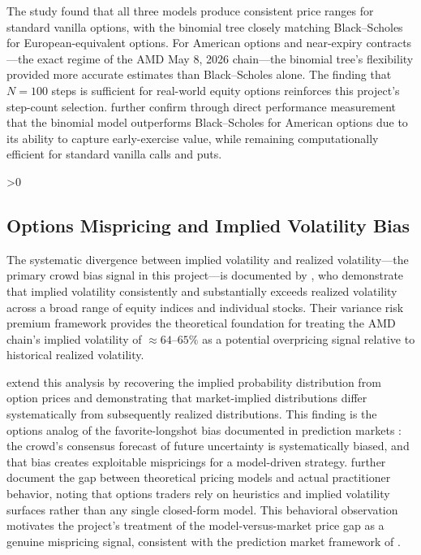 \documentclass[12pt, letterpaper]{article}
\let\oldsubsection\subsection
\renewcommand{\subsection}{%
  \ifnum\value{subsection}>0 \clearpage\fi
  \oldsubsection
}
\begin{document}
The study found that all three models produce consistent price ranges
for standard vanilla options, with the binomial tree closely matching
Black--Scholes for European-equivalent options. For American options
and near-expiry contracts---the exact regime of the AMD May 8, 2026
chain---the binomial tree's flexibility provided more accurate
estimates than Black--Scholes alone. The finding that $N = 100$ steps
is sufficient for real-world equity options reinforces this project's
step-count selection. \citet{Nwobi2017} further confirm through direct
performance measurement that the binomial model outperforms
Black--Scholes for American options due to its ability to capture
early-exercise value, while remaining computationally efficient for
standard vanilla calls and puts.

\subsection{Options Mispricing and Implied Volatility Bias}

The systematic divergence between implied volatility and realized
volatility---the primary crowd bias signal in this project---is
documented by \citet{Carr2009}, who demonstrate that implied volatility
consistently and substantially exceeds realized volatility across a
broad range of equity indices and individual stocks. Their variance
risk premium framework provides the theoretical foundation for treating
the AMD chain's implied volatility of $\approx 64$--$65\%$ as a
potential overpricing signal relative to historical realized volatility.

\citet{Jackwerth1996} extend this analysis by recovering the implied
probability distribution from option prices and demonstrating that
market-implied distributions differ systematically from subsequently
realized distributions. This finding is the options analog of the
favorite-longshot bias documented in prediction markets
\citep{Thaler1988}: the crowd's consensus forecast of future
uncertainty is systematically biased, and that bias creates exploitable
mispricings for a model-driven strategy. \citet{Haug2011} further
document the gap between theoretical pricing models and actual
practitioner behavior, noting that options traders rely on heuristics
and implied volatility surfaces rather than any single closed-form
model. This behavioral observation motivates the project's treatment of
the model-versus-market price gap as a genuine mispricing signal,
consistent with the prediction market framework of
\citet{Wolfers2004}.
\end{document}
